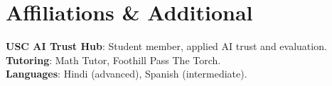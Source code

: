 \documentclass[letterpaper,10pt]{article}
\begin{document}
\section{Affiliations \& Additional}
\vspace{-1pt}
\noindent\hspace*{0.15in}\begin{minipage}{0.94\textwidth}
\small{
\textbf{USC AI Trust Hub}: Student member, applied AI trust and evaluation.\\
\textbf{Tutoring}: Math Tutor, Foothill Pass The Torch.\\
\textbf{Languages}: Hindi (advanced), Spanish (intermediate).
}
\end{minipage}
\end{document}
